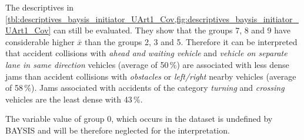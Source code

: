 The descriptives in \cref{tbl:descriptives_baysis_initiator_UArt1_Cov,fig:descriptives_baysis_initiator_UArt1_Cov} can still be evaluated. They show that the groups 7, 8 and 9 have considerable higher $\bar{x}$ than the groups 2, 3 and 5. Therefore it can be interpreted that accident collisions with \textit{ahead and waiting vehicle} and \textit{vehicle on separate lane in same direction} vehicles (average of 50\,\%) are associated with less dense jams than accident collisions with \textit{obstacles} or \textit{left/right} nearby vehicles (average of 58\,\%). Jams associated with accidents of the category \textit{turning} and \textit{crossing} vehicles are the least dense with 43\,\%.

 The variable value of group 0, which occurs in the dataset is undefined by BAYSIS and will be therefore neglected for the interpretation.  

